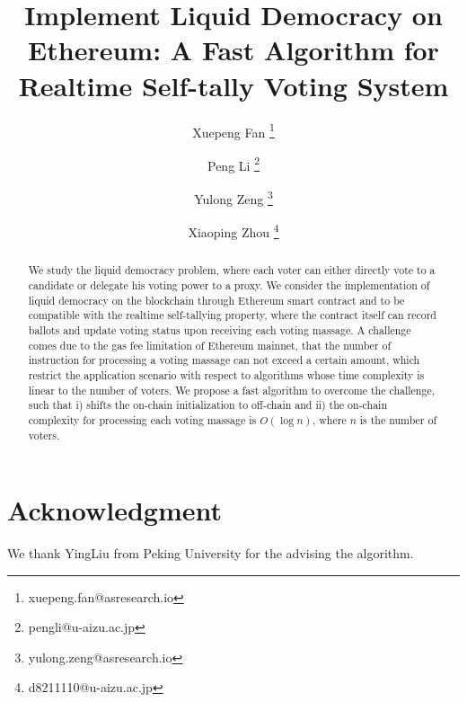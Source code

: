 \documentclass[12pt]{article}
\begin{document}
	\pagestyle{empty}

	\title{Implement Liquid Democracy on Ethereum: A Fast Algorithm for Realtime Self-tally Voting System}
\author[1]{Xuepeng Fan \thanks{xuepeng.fan@asresearch.io}}
\author[2]{Peng Li \thanks{pengli@u-aizu.ac.jp}}
\author[1]{Yulong Zeng \thanks{yulong.zeng@asresearch.io}}
\author[2]{Xiaoping Zhou \thanks{d8211110@u-aizu.ac.jp}}

\maketitle
\begin{abstract}
	We study the liquid democracy problem, where each voter can either directly vote to a candidate or delegate his voting power to a proxy. We consider the implementation of liquid democracy on the blockchain through Ethereum smart contract and to be compatible with the realtime self-tallying property, where the contract itself can record  ballots and update voting status upon receiving each voting massage.  A challenge comes due to the gas fee limitation of Ethereum mainnet, that the number of instruction for processing a voting massage can not exceed a certain amount, which restrict the application scenario with respect to algorithms whose time complexity is linear to the number of voters. We propose a fast algorithm to overcome the challenge, such that i) shifts the on-chain initialization to off-chain and ii) the on-chain complexity for processing each voting massage is $O(\log n)$, where $n$ is the number of voters. %
\end{abstract}







\section*{Acknowledgment}
We thank YingLiu from Peking University for the advising the algorithm.



\end{document}
